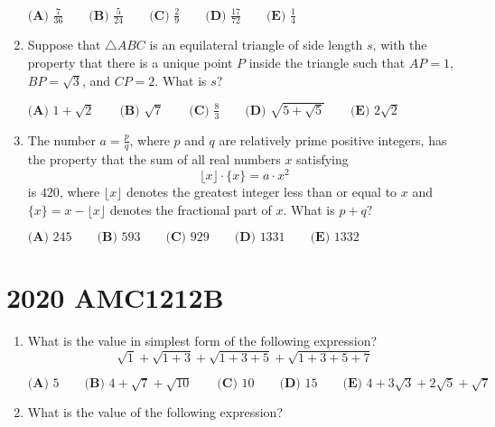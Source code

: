 \documentclass{article}
\begin{document}
\begin{enumerate}[label=\arabic*., itemsep=0.5em]
$\textbf{(A) } \frac{7}{36} \qquad\textbf{(B) } \frac{5}{24} \qquad\textbf{(C) } \frac{2}{9} \qquad\textbf{(D) } \frac{17}{72} \qquad\textbf{(E) } \frac{1}{4}$\par \vspace{0.5em}\item Suppose that $\triangle ABC$ is an equilateral triangle of side length $s$, with the property that there is a unique point $P$ inside the triangle such that $AP = 1$, $BP = \sqrt{3}$, and $CP = 2$. What is $s?$

$\textbf{(A) } 1 + \sqrt{2} \qquad \textbf{(B) } \sqrt{7} \qquad \textbf{(C) } \frac{8}{3} \qquad \textbf{(D) } \sqrt{5 + \sqrt{5}} \qquad \textbf{(E) } 2\sqrt{2}$\par \vspace{0.5em}\item The number $a = \tfrac{p}{q}$, where $p$ and $q$ are relatively prime positive integers, has the property that the sum of all real numbers $x$ satisfying
\begin{equation*}
\lfloor x \rfloor \cdot \{x\} = a \cdot x^2
\end{equation*}
is $420$, where $\lfloor x \rfloor$ denotes the greatest integer less than or equal to $x$ and $\{x\} = x - \lfloor x \rfloor$ denotes the fractional part of $x$. What is $p + q?$

$\textbf{(A) } 245 \qquad \textbf{(B) } 593 \qquad \textbf{(C) } 929 \qquad \textbf{(D) } 1331 \qquad \textbf{(E) } 1332$\par \vspace{0.5em}\end{enumerate}\newpage\section*{2020 AMC1212B}\begin{enumerate}[label=\arabic*., itemsep=0.5em]\item What is the value in simplest form of the following expression?
\begin{equation*}
\sqrt{1} + \sqrt{1+3} + \sqrt{1+3+5} + \sqrt{1+3+5+7}
\end{equation*}


$\textbf{(A) }5 \qquad \textbf{(B) }4 + \sqrt{7} + \sqrt{10} \qquad \textbf{(C) } 10 \qquad \textbf{(D) } 15 \qquad \textbf{(E) } 4 + 3\sqrt{3} + 2\sqrt{5} + \sqrt{7}$\par \vspace{0.5em}\item What is the value of the following expression?


\end{enumerate}
\end{document}
